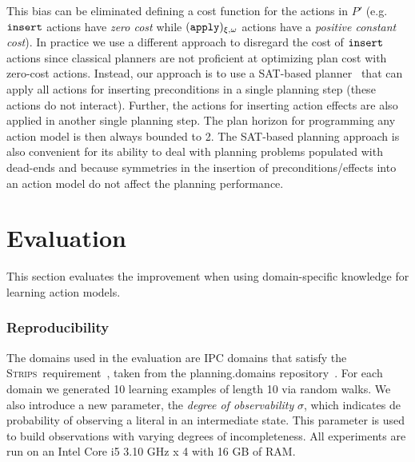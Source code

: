 \documentclass{article}
\newcommand{\strips}{\textsc{Strips}}
\begin{document}
This bias can be eliminated defining a cost function for the actions in $P'$ (e.g. ${\tt \small insert}$ actions have {\em zero cost} while ${\tt \small (apply)_{\xi,\omega}}$ actions have a {\em positive constant cost}). In practice we use a different approach to disregard the cost of ${\tt \small insert}$ actions since classical planners are not proficient at optimizing plan cost with zero-cost actions. Instead, our approach is to use a SAT-based planner~\cite{rintanen2014madagascar} that can apply all actions for inserting preconditions in a single planning step (these actions do not interact). Further, the actions for inserting action effects are also applied in another single planning step. The plan horizon for programming any action model is then always bounded to 2. The SAT-based planning approach is also convenient for its ability to deal with planning problems populated with dead-ends and because symmetries in the insertion of preconditions/effects into an action model do not affect the planning performance.



\section{Evaluation}
\label{sec:evaluation}
This section evaluates the improvement when using domain-specific knowledge for learning action models.

\subsubsection{Reproducibility}
The domains used in the evaluation are IPC domains that satisfy the \strips\ requirement~\cite{fox2003pddl2}, taken from the {\sc planning.domains} repository~\cite{muise2016planning}. For each domain we generated 10 learning examples of length 10 via random walks. We also introduce a new parameter, the {\em degree of observability} $\sigma$, which indicates de probability of observing a literal in an intermediate state. This parameter is used to build observations with varying degrees of incompleteness. All experiments are run on an Intel Core i5 3.10 GHz x 4 with 16 GB of RAM.


\end{document}
